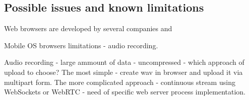 \subsection{Possible issues and known limitations}
Web browsers are developed by several companies and 



Mobile OS browsers limitations - audio recording.

Audio recording - large ammount of data - uncompressed - which approach of upload to choose? The most simple - create wav in browser and upload it via multipart form. The more complicated approach - continuous stream using WebSockets or WebRTC - need of specific web server process implementation.
